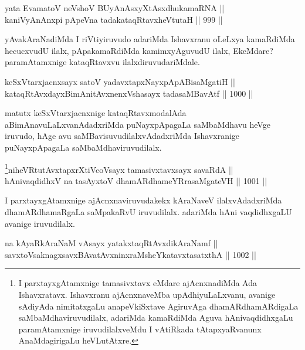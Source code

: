 \begin{shl}
yata EvamatoV neVshoV BUyAnAsxyXtAsxdhukamaRNA || \\
kaniVyAnAnxpi pApeVna tadakataqRtavxheVtutaH \hfill || 999 ||  
\end{shl}

\begin{artha}
yAvakAraNadiMda I riVtiyiruvudo adariMda Ishavxranu oLeLxya kamaRdiMda hecucxvudU ilalx, pApakamaRdiMda kamimxyAguvudU ilalx, EkeMdare? paramAtamxnige kataqRtavxvu ilalxdiruvudariMdale.
\end{artha}

\begin{shl}
keSxVtarxjacnxsayx satoV yadavxtapxNayxpApABisaMgatiH || \\
kataqRtAvxdayxBimAnitAvxnenxVshasayx tadasaMBavAtf \hfill || 1000 ||  
\end{shl}

\begin{artha}
matutx keSxVtarxjacnxnige kataqRtavxmodalAda aBimAnavuLaLxvanAdadxriMda puNayxpApagaLa saMbaMdhavu heVge iruvudo, hAge avu saMBavisuvudilalxvAdadxriMda Ishavxranige puNayxpApagaLa saMbaMdhaviruvudilalx.
\end{artha}

\begin{shl}
\footnote{I parxtayxgAtamxnige tamasivxtavx eMdare ajAcnxnadiMda Ada Ishavxratavx. Ishavxranu ajAcnxnaveMba upAdhiyuLaLxvanu, avanige sAdiyAda nimitatxgaLu anapeVkiSxtave AgiruvAga dhamARdhamARdigaLa saMbaMdhaviruvudilalx, adariMda kamaRdiMda Aguva hAnivaqdidhxgaLu paramAtamxnige iruvudilalxveMdu I vAtiRkada tAtapxyaRvanunx AnaMdagirigaLu heVLutAtxre.}niheVRtutAvxtapxrXtiVcoV\s sayx tamasivxtavxsayx savaRdA || \\
hAnivaqdidhxV na tasAyxtoV dhamARdhameYRrasaMgateVH \hfill || 1001 ||  
\end{shl}

\begin{artha}
 I parxtayxgAtamxnige ajAcnxnaviruvudakekx kAraNaveV ilalxvAdadxriMda dhamARdhamaRgaLa saMpakaRvU iruvudilalx. adariMda hAni vaqdidhxgaLU avanige iruvudilalx.
\end{artha}


\begin{shl}
na kAyaRkAraNaM vA\s sayx yatakxtaqRtAvxdikAraNamf || \\
savxtoV\s saknagxsavxBAvatAvxninxraMsheYkatavxtasatxthA \hfill || 1002 ||  
\end{shl}

